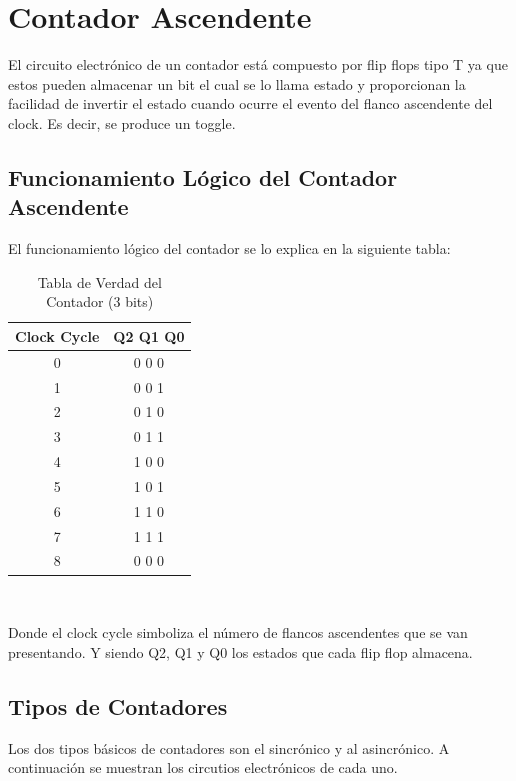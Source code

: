 \chapter{Contador Ascendente}
El circuito electr\'onico de un contador est\'a compuesto por flip flops tipo T ya que estos pueden almacenar un bit el cual se lo llama estado y proporcionan la facilidad de invertir el estado cuando ocurre el evento del flanco ascendente del clock. Es decir, se produce un toggle.
\section{Funcionamiento Lógico del Contador Ascendente}
El funcionamiento lógico del contador se lo explica en la siguiente tabla:
\begin{center}
	\begin{table}[h!]
		\begin{center}
			\caption{Tabla de Verdad del Contador (3 bits)}
			\begin{tabular}{|c|c|}
				\hline
				\textbf{Clock Cycle} & \textbf{Q2 Q1 Q0} \\
				\hline
				0 & 0 0 0\\
				\hline
				1 & 0 0 1\\
				\hline
				2 & 0 1 0\\
				\hline
				3 & 0 1 1\\
				\hline
				4 & 1 0 0\\
				\hline
				5 & 1 0 1\\
				\hline
				6 & 1 1 0\\
				\hline
				7 & 1 1 1\\
				\hline
				8 & 0 0 0\\
				\hline
			\end{tabular} \\
		\end{center}
	\end{table}
\end{center}
Donde el clock cycle simboliza el número de flancos ascendentes que se van presentando. Y siendo Q2, Q1 y Q0 los estados que cada flip flop almacena.

\section{Tipos de Contadores}
Los dos tipos básicos de contadores son el sincrónico y al asincrónico. A continuación se muestran los circutios electrónicos de cada uno.

